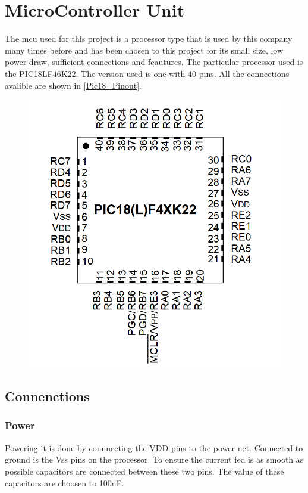 


\section{MicroController Unit}
The \gls{mcu} used for this project is a processor type that is used by this company many times before and has been chosen to this project for its small size, low power draw, sufficient connections and feautures. The particular processor used is the PIC18LF46K22\cite{pic18}. The version used is one with 40 pins. All the connections avalible are shown in \autoref{Pic18_Pinout}.

\begin{figure}[H] 
\centering 
\includegraphics[width=.7\linewidth]{Figures/Pic18_pinout} 
\label{Pic18_Pinout} 
\end{figure} 

\subsection{Connenctions}

 \subsubsection{Power}
Powering it is done by connnecting the VDD pins to the power net. Connected to ground is the Vss pins on the processor. To ensure the current fed is as smooth as possible capacitors are connected between these two pins. The value of these capacitors are choosen to 100nF.  

